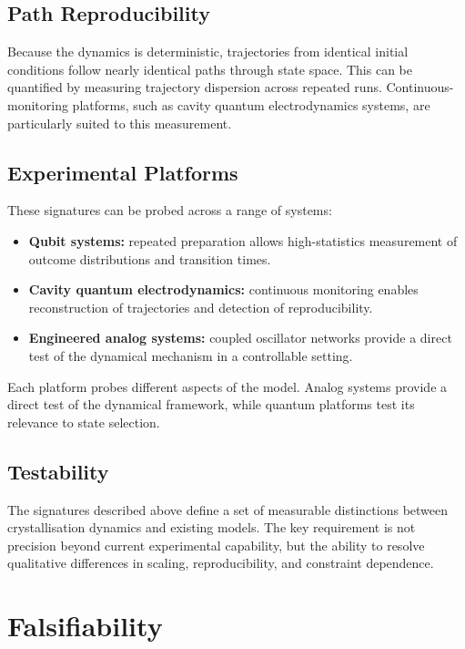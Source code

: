 \documentclass[12pt]{article}
\begin{document}
\subsection{Path Reproducibility}

Because the dynamics is deterministic, trajectories from identical initial conditions follow nearly identical paths through state space. This can be quantified by measuring trajectory dispersion across repeated runs. Continuous-monitoring platforms, such as cavity quantum electrodynamics systems, are particularly suited to this measurement.

\subsection{Experimental Platforms}

These signatures can be probed across a range of systems:
\begin{itemize}
\item \textbf{Qubit systems:} repeated preparation allows high-statistics measurement of outcome distributions and transition times.
\item \textbf{Cavity quantum electrodynamics:} continuous monitoring enables reconstruction of trajectories and detection of reproducibility.
\item \textbf{Engineered analog systems:} coupled oscillator networks provide a direct test of the dynamical mechanism in a controllable setting.
\end{itemize}
Each platform probes different aspects of the model. Analog systems provide a direct test of the dynamical framework, while quantum platforms test its relevance to state selection.

\subsection{Testability}

The signatures described above define a set of measurable distinctions between crystallisation dynamics and existing models. The key requirement is not precision beyond current experimental capability, but the ability to resolve qualitative differences in scaling, reproducibility, and constraint dependence.

\section{Falsifiability}
\end{document}
